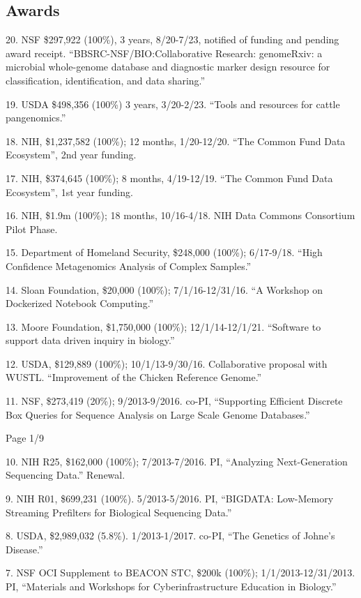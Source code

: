 \documentclass[margin,line]{resume}
\begin{document}
\begin{resume}
\section{\mysidestyle Awards}

20. NSF \$297,922 (100\%), 3 years, 8/20-7/23, notified of funding and pending award receipt. ``BBSRC-NSF/BIO:Collaborative Research: genomeRxiv: a microbial whole-genome database and diagnostic marker design resource for classification, identification, and data sharing.''

19. USDA \$498,356 (100\%) 3 years, 3/20-2/23. ``Tools and resources for cattle pangenomics.''

18. NIH, \$1,237,582 (100\%); 12 months, 1/20-12/20. ``The Common Fund Data Ecosystem'', 2nd year funding.

17. NIH, \$374,645 (100\%); 8 months, 4/19-12/19. ``The Common Fund Data Ecosystem'', 1st year funding.

16. NIH, \$1.9m (100\%); 18 months, 10/16-4/18. NIH Data Commons Consortium Pilot Phase.

15. Department of Homeland Security, \$248,000 (100\%); 6/17-9/18. ``High Confidence Metagenomics Analysis of Complex Samples.''

14. Sloan Foundation, \$20,000 (100\%); 7/1/16-12/31/16. ``A Workshop on Dockerized Notebook Computing.''

13. Moore Foundation, \$1,750,000 (100\%); 12/1/14-12/1/21.  ``Software to support data driven inquiry in biology.''

12. USDA, \$129,889 (100\%); 10/1/13-9/30/16.  Collaborative proposal with WUSTL. ``Improvement of the Chicken Reference Genome.''

11. NSF, \$273,419 (20\%); 9/2013-9/2016. co-PI, ``Supporting Efficient Discrete Box Queries for Sequence Analysis on Large Scale Genome Databases.''

\vspace{2cm}
{\centerline {Page 1/9}}

\newpage

10. NIH R25, \$162,000 (100\%); 7/2013-7/2016.  PI, ``Analyzing Next-Generation Sequencing Data.'' Renewal.

9. NIH R01, \$699,231 (100\%). 5/2013-5/2016. PI, ``BIGDATA: Low-Memory Streaming Prefilters for Biological Sequencing Data.''

8. USDA, \$2,989,032 (5.8\%). 1/2013-1/2017.  co-PI, ``The Genetics of Johne's Disease.''

7. NSF OCI Supplement to BEACON STC, \$200k (100\%); 1/1/2013-12/31/2013.  PI, ``Materials and Workshops for Cyberinfrastructure Education in Biology.''


\end{resume}
\end{document}
